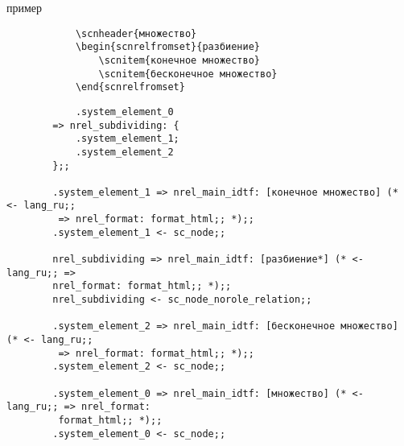 \begin{scnindent}
\end{scnindent}
\begin{scnrelfromlist}{пример}
	{
		\begin{verbatim}
			\scnheader{множество}
			\begin{scnrelfromset}{разбиение}
				\scnitem{конечное множество}
				\scnitem{бесконечное множество}
			\end{scnrelfromset}
		\end{verbatim}
	}
	{
		\begin{verbatim}
			.system_element_0
		=> nrel_subdividing: {
			.system_element_1;
			.system_element_2
		};;

		.system_element_1 => nrel_main_idtf: [конечное множество] (* <- lang_ru;;
		 => nrel_format: format_html;; *);;
		.system_element_1 <- sc_node;;
		
		nrel_subdividing => nrel_main_idtf: [разбиение*] (* <- lang_ru;; =>
		nrel_format: format_html;; *);;
		nrel_subdividing <- sc_node_norole_relation;;

		.system_element_2 => nrel_main_idtf: [бесконечное множество] (* <- lang_ru;;
		 => nrel_format: format_html;; *);;
		.system_element_2 <- sc_node;;
		
		.system_element_0 => nrel_main_idtf: [множество] (* <- lang_ru;; => nrel_format:
		 format_html;; *);;
		.system_element_0 <- sc_node;;

		\end{verbatim}
	}
\end{scnrelfromlist}

